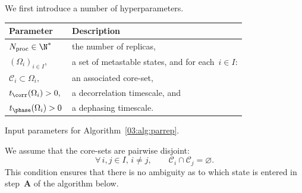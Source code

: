     We first introduce a number of hyperparameters.
    \noindent
{
\begin{center}
\begin{tabular}{ll}
\toprule
\textbf{Parameter} & \textbf{Description} \\
\midrule
$N_{\mathrm{proc}}\in\N^*$ & the number of replicas,\\
$(\Omega_i)_{i\in I}$,& a set of metastable states, and for each~$i\in I$: \\
$\mathcal C_i\subset \Omega_i,$ & an associated core-set, \\
$t_{\corr}(\Omega_i)>0,$ & a decorrelation timescale, and\\
$t_{\phase}(\Omega_i)>0\,$ & a dephasing timescale. \\
\bottomrule
\end{tabular}

\noindent
Input parameters for Algorithm~\ref{03:alg:parrep}.
\end{center}
}
We assume that the core-sets are pairwise disjoint:
\begin{equation}
    \label{03:eq:disjoint_coresets}
    \forall\,i,j\in I,\,i\neq j,\qquad \mathcal C_i \cap \mathcal C_j =\varnothing.
\end{equation}
This condition ensures that there is no ambiguity as to which state is entered in step~{\bf{A}} of the algorithm below.
